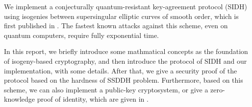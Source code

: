 
We implement a conjecturally quantum-resistant key-agreement protocol (SIDH) using isogenies 
between supersingular elliptic curves of smooth order, which is first published in \cite{PQCRYPTO:JaoDeFo11}.
The fastest known attacks against this scheme, even on quantum computers, require fully exponential time.

In this report, we briefly introduce some mathmatical concepts as the foundation of 
isogeny-based cryptography, and then introduce the protocol of SIDH and our implementation, 
with some details. 
After that, we give a security proof of the protocol based on the hardness of SSDDH problem. 
Furthermore, based on this scheme, we can also implement a public-key cryptosystem, 
or give a zero-knowledge proof of identity, which are given in \cite{PQCRYPTO:JaoDeFo11}.
